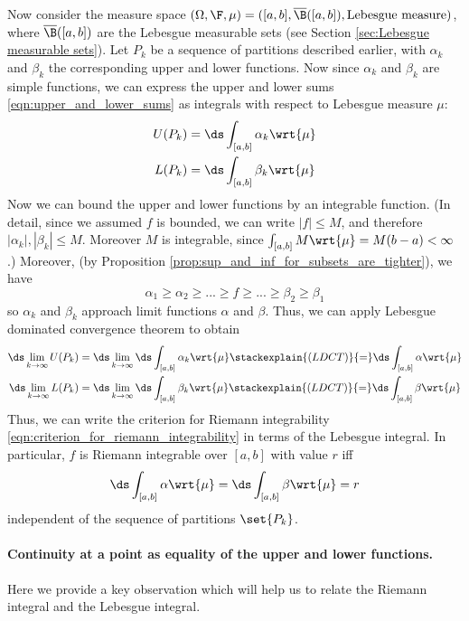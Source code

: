 \documentclass{article} %
\newcommand{\dmu}{\wrt{\mu}}
\begin{document}
Now consider the measure space $(\Omega, \F, \mu) = ([a,b], \overline{\B}([a,b]), \text{Lebesgue measure})$, where $\overline{\B}([a,b])$ are the Lebesgue measurable sets (see Section \ref{sec:Lebesgue measurable sets}).  Let $P_k$ be a sequence of partitions described earlier, with $\alpha_k$ and $\beta_k$ the corresponding upper and lower functions.  Now since $\alpha_k$ and $\beta_k$ are simple functions, we can express the upper and lower sums \eqref{eqn:upper_and_lower_sums} as integrals with respect to Lebesgue measure $\mu$:
\begin{align*}
U(P_k) &= \ds\int_{[a,b]} \alpha_k \dmu \\
L(P_k) &= \ds\int_{[a,b]} \beta_k \dmu \\		
\end{align*}
Now we can bound the upper and lower functions by an integrable function. {\tiny (In detail, since we assumed $f$ is bounded,  we can write $|f| \leq M$, and therefore $|\alpha_k|,|\beta_k| \leq M$.  Moreover $M$ is integrable, since $\int_{[a,b]} M \dmu = M(b-a) < \infty$.)} Moreover, {\tiny (by Proposition \ref{prop:sup_and_inf_for_subsets_are_tighter})}, we have 
\[ \alpha_1 \geq \alpha_2 \geq ... \geq f \geq ... \geq \beta_2 \geq \beta_1 \]
so $\alpha_k$ and $\beta_k$ approach limit functions $\alpha$ and $\beta$.   Thus, we can apply Lebesgue dominated convergence theorem to obtain
\begin{align*}
\ds\lim_{k \to \infty} U(P_k) &= \ds\lim_{k \to \infty} \ds\int_{[a,b]} \alpha_k \dmu \stackexplain{(LDCT)}{=}  \ds\int_{[a,b]} \alpha \dmu  \\
\ds\lim_{k \to \infty} L(P_k) &= \ds\lim_{k \to \infty} \ds\int_{[a,b]} \beta_k \dmu \stackexplain{(LDCT)}{=}  \ds\int_{[a,b]} \beta \dmu   \\	
\end{align*}
Thus, we can write the criterion for Riemann integrability \eqref{eqn:criterion_for_riemann_integrability} in terms of the Lebesgue integral.  In particular, $f$ is Riemann integrable over $[a,b]$ with value $r$ iff 
\begin{align}
\ds\int_{[a,b]} \alpha \dmu = \ds\int_{[a,b]} \beta \dmu  = r
\label{eqn:criterion_for_riemann_integrability_in_terms_of_lebesgue_integral}
\end{align}
independent of the sequence of partitions $\set{P_k}$.


\paragraph{Continuity at a point as equality of the upper and lower functions.}  Here we provide a key observation which will help us to relate the Riemann integral and the Lebesgue integral. 
\end{document}
